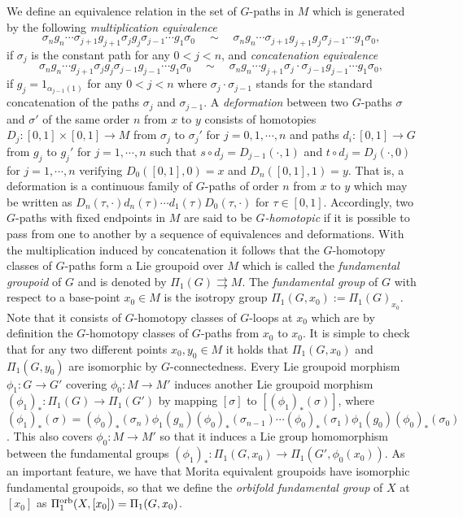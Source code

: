 \documentclass[
  a4paper, 
  reqno, 
  oneside, 
  12pt
]{amsart}
\theoremstyle{definition}
\theoremstyle{remark}
\newcommand{\rr}{\rightrightarrows}
\begin{document}
We define an equivalence relation in the set of $G$-paths in $M$ which is generated by the following \emph{multiplication equivalence}
$$\sigma_n g_n\cdots \sigma_{j+1}g_{j+1}\sigma_jg_j\sigma_{j-1}\cdots g_1\sigma_0 \quad\sim\quad \sigma_n g_n\cdots \sigma_{j+1}g_{j+1}g_j\sigma_{j-1}\cdots g_1\sigma_0,$$
if $\sigma_j$ is the constant path for any $0<j<n$, and  \emph{concatenation equivalence}
$$\sigma_n g_n\cdots g_{j+1}\sigma_jg_j\sigma_{j-1}g_{j-1}\cdots g_1\sigma_0 \quad\sim\quad \sigma_n g_n\cdots g_{j+1}\sigma_j\cdot\sigma_{j-1}g_{j-1}\cdots g_1\sigma_0,$$
if $g_j=1_{\alpha_{j-1}(1)}$ for any $0<j<n$ where $\sigma_j\cdot\sigma_{j-1}$ stands for the standard concatenation of the paths $\sigma_j$ and $\sigma_{j-1}$. A \emph{deformation} between two $G$-paths $\sigma$ and $\sigma'$ of the same order $n$ from $x$ to $y$ consists of homotopies $D_j:[0,1]\times [0,1]\to M$ from $\sigma_j$ to $\sigma_j'$ for $j=0,1,\cdots, n$ and paths $d_i:[0,1]\to G$ from $g_j$ to $g_j'$ for $j=1,\cdots, n$ such that $s\circ d_j=D_{j-1}(\cdot,1)$ and $t\circ d_j=D_{j}(\cdot,0)$ for $j=1,\cdots, n$ verifying $D_0([0,1],0)=x$ and $D_n([0,1],1)=y$. That is, a deformation is a continuous family of $G$-paths of order $n$ from $x$ to $y$ which may be written as $D_n(\tau,\cdot)d_n(\tau)\cdots d_1(\tau)D_0(\tau,\cdot)$ for $\tau\in [0,1]$. Accordingly, two $G$-paths with fixed endpoints in $M$ are said to be \emph{$G$-homotopic} if it is possible to pass from one to another by a sequence of equivalences and deformations. With the multiplication induced by concatenation it follows that the $G$-homotopy classes of $G$-paths form a Lie groupoid over $M$ which is called the \emph{fundamental groupoid} of $G$ and is denoted by $\Pi_1(G)\rr M$. The \emph{fundamental group} of $G$ with respect to a base-point $x_0\in M$ is the isotropy group $\Pi_1(G, x_0):= \Pi_1(G)_{x_0}$. Note that it consists of $G$-homotopy classes of $G$-loops at $x_0$ which are by definition the $G$-homotopy classes of $G$-paths from $x_0$ to $x_0$. It is simple to check that for any two different points $x_0,y_0\in M$ it holds that $\Pi_1(G, x_0)$ and $\Pi_1(G, y_0)$ are isomorphic by $G$-connectedness. Every Lie groupoid morphism $\phi_1:G\to G'$ covering $\phi_0:M\to M'$ induces another Lie groupoid morphism $(\phi_1)_\ast:\Pi_1(G)\to \Pi_1(G')$ by mapping $[\sigma]$ to $[(\phi_1)_\ast(\sigma)]$, where $(\phi_1)_\ast(\sigma)=(\phi_0)_\ast(\sigma_n)\phi_1(g_n)(\phi_0)_\ast(\sigma_{n-1})\cdots (\phi_0)_\ast(\sigma_1)\phi_1(g_0)(\phi_0)_\ast(\sigma_0)$. This also covers $\phi_0:M\to M'$ so that it induces a Lie group homomorphism between the fundamental groups  $(\phi_1)_\ast:\Pi_1(G,x_0)\to \Pi_1(G',\phi_0(x_0))$. As an important feature, we have that Morita equivalent groupoids have isomorphic fundamental groupoids, so that we define the \emph{orbifold fundamental group} of $X$ at $[x_0]$ as $\Pi_1^\textnormal{orb}(X,[x_0])=\Pi_1(G,x_0)$.
\end{document}
